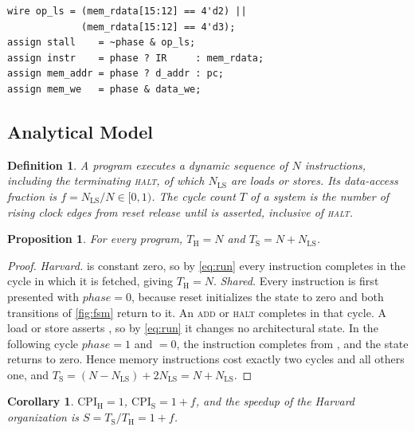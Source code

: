 \documentclass[conference]{IEEEtran}
\newtheorem{definition}{Definition}
\newtheorem{proposition}{Proposition}
\newtheorem{corollary}{Corollary}
\newcommand{\NLS}{N_{\mathrm{LS}}}
\newcommand{\Tharv}{T_{\mathrm{H}}}
\newcommand{\Tshr}{T_{\mathrm{S}}}
\newcommand{\sig}[1]{\texttt{\detokenize{#1}}}
\begin{document}
\begin{lstlisting}[caption={Port arbitration (\texttt{shared\_mem\_controller.v}).},label={lst:ctrl},float=t]
wire op_ls = (mem_rdata[15:12] == 4'd2) ||
             (mem_rdata[15:12] == 4'd3);
assign stall    = ~phase & op_ls;
assign instr    = phase ? IR     : mem_rdata;
assign mem_addr = phase ? d_addr : pc;
assign mem_we   = phase & data_we;
\end{lstlisting}

\subsection{Analytical Model}
\label{sec:model}
\begin{definition}
A program executes a dynamic sequence of $N$ instructions, including the terminating \textsc{halt},
of which $\NLS$ are loads or stores. Its \emph{data-access fraction} is $f = \NLS/N \in [0,1)$. The
\emph{cycle count} $T$ of a system is the number of rising clock edges from reset release until
\sig{halted} is asserted, inclusive of \textsc{halt}.
\end{definition}

\begin{proposition}\label{prop:cycles}
For every program, $\Tharv = N$ and $\Tshr = N + \NLS$.
\end{proposition}

\begin{proof}
\emph{Harvard.} \sig{stall} is constant zero, so by \eqref{eq:run} every instruction completes in the
cycle in which it is fetched, giving $\Tharv = N$.
\emph{Shared.} Every instruction is first presented with $\mathit{phase}=0$, because reset initializes
the state to zero and both transitions of \cref{fig:fsm} return to it. An \textsc{add} or
\textsc{halt} completes in that cycle. A load or store asserts \sig{stall}, so by \eqref{eq:run} it
changes no architectural state. In the following cycle $\mathit{phase}=1$ and \sig{stall}$=0$, the
instruction completes from \sig{IR}, and the state returns to zero. Hence memory instructions cost
exactly two cycles and all others one, and $\Tshr = (N-\NLS) + 2\NLS = N + \NLS$.
\end{proof}

\begin{corollary}\label{cor:cpi}
$\mathrm{CPI}_{\mathrm{H}} = 1$, $\mathrm{CPI}_{\mathrm{S}} = 1+f$, and the speedup of the Harvard
organization is $S = \Tshr/\Tharv = 1+f$.
\end{corollary}
\end{document}
